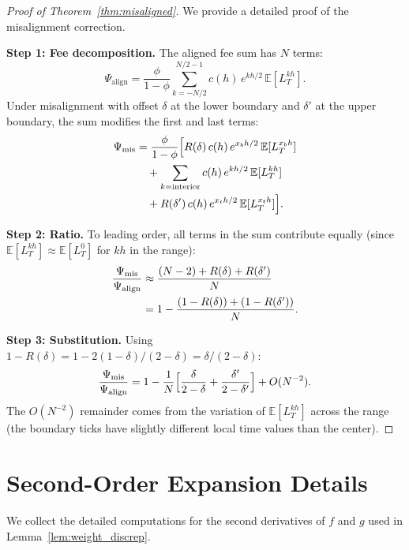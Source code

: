 \documentclass[11pt]{article}
\theoremstyle{definition}
\theoremstyle{remark}
\newcommand{\E}{\mathbb{E}}
\begin{document}
\begin{proof}[Proof of Theorem~\ref{thm:misaligned}]
We provide a detailed proof of the misalignment correction.

\textbf{Step 1: Fee decomposition.}
The aligned fee sum has $N$ terms:
\begin{equation}\label{eq:aligned_sum}
\Psi_{\mathrm{align}} = \frac{\phi}{1-\phi}
\sum_{k=-N/2}^{N/2-1} c(h)\,e^{kh/2}\,\E[L^{kh}_T].
\end{equation}
Under misalignment with offset $\delta$ at the lower boundary and
$\delta'$ at the upper boundary, the sum modifies the first and last
terms:
\begin{align}
\Psi_{\mathrm{mis}} &= \frac{\phi}{1-\phi}\Bigl[
R(\delta)\,c(h)\,e^{x_b h/2}\,\E[L^{x_b h}_T] \notag \\
&\quad + \sum_{k=\text{interior}} c(h)\,e^{kh/2}\,\E[L^{kh}_T]
\notag \\
&\quad + R(\delta')\,c(h)\,e^{x_t h/2}\,\E[L^{x_t h}_T]
\Bigr].
\label{eq:misaligned_sum}
\end{align}

\textbf{Step 2: Ratio.}
To leading order, all terms in the sum contribute equally
(since $\E[L^{kh}_T] \approx \E[L^0_T]$ for $kh$ in the range):
\begin{align}
\frac{\Psi_{\mathrm{mis}}}{\Psi_{\mathrm{align}}}
&\approx \frac{(N-2) + R(\delta) + R(\delta')}{N}
\notag \\
&= 1 - \frac{(1-R(\delta)) + (1-R(\delta'))}{N}.
\label{eq:ratio_derivation}
\end{align}

\textbf{Step 3: Substitution.}
Using $1 - R(\delta) = 1 - 2(1-\delta)/(2-\delta)
= \delta/(2-\delta)$:
\begin{equation}\label{eq:final_correction}
\frac{\Psi_{\mathrm{mis}}}{\Psi_{\mathrm{align}}}
= 1 - \frac{1}{N}\Bigl[\frac{\delta}{2-\delta}
+ \frac{\delta'}{2-\delta'}\Bigr] + O(N^{-2}).
\end{equation}
The $O(N^{-2})$ remainder comes from the variation of $\E[L^{kh}_T]$
across the range (the boundary ticks have slightly different local
time values than the center).
\end{proof}

\section{Second-Order Expansion Details}\label{app:second_order}

We collect the detailed computations for the second derivatives of
$f$ and $g$ used in Lemma~\ref{lem:weight_discrep}.
\end{document}
